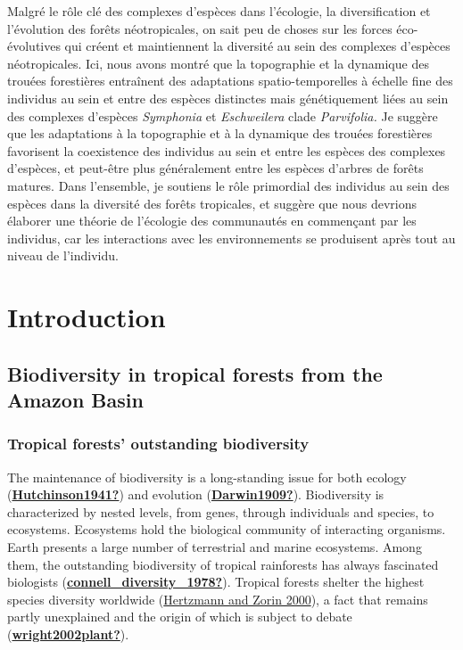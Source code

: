 \documentclass[12pt,twoside,a4paper, a]{article}
\let\oldsection\section
\renewcommand\section{\clearpage\oldsection}
\begin{document}
Malgré le rôle clé des complexes d'espèces dans l'écologie, la diversification et l'évolution des forêts néotropicales, on sait peu de choses sur les forces éco-évolutives qui créent et maintiennent la diversité au sein des complexes d'espèces néotropicales. Ici, nous avons montré que la topographie et la dynamique des trouées forestières entraînent des adaptations spatio-temporelles à échelle fine des individus au sein et entre des espèces distinctes mais génétiquement liées au sein des complexes d'espèces \emph{Symphonia} et \emph{Eschweilera} clade \emph{Parvifolia.} Je suggère que les adaptations à la topographie et à la dynamique des trouées forestières favorisent la coexistence des individus au sein et entre les espèces des complexes d'espèces, et peut-être plus généralement entre les espèces d'arbres de forêts matures. Dans l'ensemble, je soutiens le rôle primordial des individus au sein des espèces dans la diversité des forêts tropicales, et suggère que nous devrions élaborer une théorie de l'écologie des communautés en commençant par les individus, car les interactions avec les environnements se produisent après tout au niveau de l'individu.

\hypertarget{introduction-1}{%
\section{Introduction}\label{introduction-1}}

\hypertarget{biodiversity-in-tropical-forests-from-the-amazon-basin}{%
\subsection{Biodiversity in tropical forests from the Amazon Basin}\label{biodiversity-in-tropical-forests-from-the-amazon-basin}}

\hypertarget{tropical-forests-outstanding-biodiversity}{%
\subsubsection{Tropical forests' outstanding biodiversity}\label{tropical-forests-outstanding-biodiversity}}

The maintenance of biodiversity is a long-standing issue for both ecology (\protect\hyperlink{ref-Hutchinson1941}{\textbf{Hutchinson1941?}}) and evolution (\protect\hyperlink{ref-Darwin1909}{\textbf{Darwin1909?}}).
Biodiversity is characterized by nested levels, from genes, through individuals and species, to ecosystems.
Ecosystems hold the biological community of interacting organisms.
Earth presents a large number of terrestrial and marine ecosystems.
Among them, the outstanding biodiversity of tropical rainforests has always fascinated biologists (\protect\hyperlink{ref-connell_diversity_1978}{\textbf{connell\_diversity\_1978?}}).
Tropical forests shelter the highest species diversity worldwide (\protect\hyperlink{ref-hertzmann2000}{Hertzmann and Zorin 2000}),
a fact that remains partly unexplained and the origin of which is subject to debate (\protect\hyperlink{ref-wright2002plant}{\textbf{wright2002plant?}}).
\end{document}

